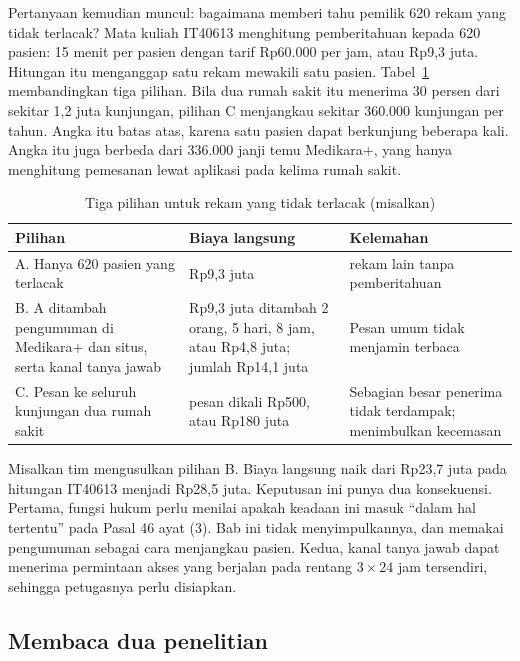 Pertanyaan kemudian muncul: bagaimana memberi tahu pemilik 620 rekam yang tidak terlacak? Mata
kuliah IT40613 menghitung pemberitahuan kepada 620 pasien: 15 menit per pasien dengan tarif Rp60.000
per jam, atau Rp9,3 juta. Hitungan itu menganggap satu rekam mewakili satu pasien.
Tabel~\ref{tab:ch07-620} membandingkan tiga pilihan. Bila dua rumah sakit itu menerima 30 persen
dari sekitar 1,2 juta kunjungan, pilihan C menjangkau sekitar 360.000 kunjungan per tahun. Angka itu
batas atas, karena satu pasien dapat berkunjung beberapa kali. Angka itu juga berbeda dari 336.000
janji temu Medikara+, yang hanya menghitung pemesanan lewat aplikasi pada kelima rumah sakit.

\begin{table}[!htb]
  \centering\small
  \caption{Tiga pilihan untuk rekam yang tidak terlacak (misalkan)}\label{tab:ch07-620}
  \begin{tabularx}{\textwidth}{|>{\raggedright\arraybackslash}X|>{\raggedright\arraybackslash}p{}|>{\raggedright\arraybackslash}X|}
    \hline
    \textbf{Pilihan} & \textbf{Biaya langsung} & \textbf{Kelemahan} \\ \hline
    A. Hanya 620 pasien yang terlacak & Rp9,3 juta & 620 rekam lain tanpa pemberitahuan \\ \hline
    B. A ditambah pengumuman di Medikara+ dan situs, serta kanal tanya jawab & Rp9,3 juta ditambah 2
    orang, 5 hari, 8 jam, atau Rp4,8 juta; jumlah Rp14,1 juta & Pesan umum tidak menjamin terbaca \\
    \hline
    C. Pesan ke seluruh kunjungan dua rumah sakit & 360.000 pesan dikali Rp500, atau Rp180 juta &
    Sebagian besar penerima tidak terdampak; menimbulkan kecemasan \\ \hline
  \end{tabularx}
\end{table}

Misalkan tim mengusulkan pilihan B. Biaya langsung naik dari Rp23,7 juta pada hitungan IT40613
menjadi Rp28,5 juta. Keputusan ini punya dua konsekuensi. Pertama, fungsi hukum perlu menilai apakah
keadaan ini masuk ``dalam hal tertentu'' pada Pasal 46 ayat (3). Bab ini tidak menyimpulkannya, dan
memakai pengumuman sebagai cara menjangkau pasien. Kedua, kanal tanya jawab dapat menerima
permintaan akses yang berjalan pada rentang $3 \times 24$ jam tersendiri, sehingga petugasnya perlu
disiapkan.

\subsection*{Membaca dua penelitian}

